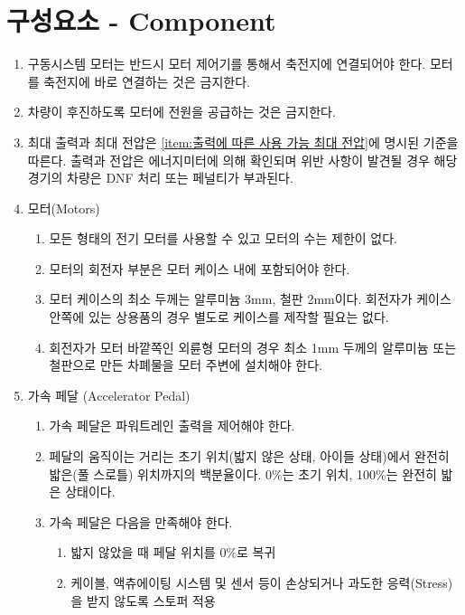 \documentclass[final,a4paper,10pt]{report}
\begin{document}
\section{구성요소 - Component}
\begin{enumerate}
  \item 구동시스템 모터는 반드시 모터 제어기를 통해서 축전지에 연결되어야 한다. 모터를 축전지에 바로 연결하는 것은 금지한다.
  \item 차량이 후진하도록 모터에 전원을 공급하는 것은 금지한다.
  \item 최대 출력과 최대 전압은 \cref{item:출력에 따른 사용 가능 최대 전압}에 명시된 기준을 따른다. 출력과 전압은 에너지미터에 의해 확인되며 위반 사항이 발견될 경우 해당 경기의 차량은 DNF 처리 또는 페널티가 부과된다.
  
  \item 모터(Motors)
    \begin{enumerate}
      \item 모든 형태의 전기 모터를 사용할 수 있고 모터의 수는 제한이 없다.
      \item 모터의 회전자 부분은 모터 케이스 내에 포함되어야 한다.
      \item 모터 케이스의 최소 두께는 알루미늄 3mm, 철판 2mm이다. 회전자가 케이스 안쪽에 있는 상용품의 경우 별도로 케이스를 제작할 필요는 없다.
      \item 회전자가 모터 바깥쪽인 외륜형 모터의 경우 최소 1mm 두께의 알루미늄 또는 철판으로 만든 차폐물을 모터 주변에 설치해야 한다.
    \end{enumerate}
    
  \item 가속 페달 (Accelerator Pedal) \label{item:가속 페달}
    \begin{enumerate}
      \item 가속 페달은 파워트레인 출력을 제어해야 한다.
      \item 페달의 움직이는 거리는 초기 위치(밟지 않은 상태, 아이들 상태)에서 완전히 밟은(풀 스로틀) 위치까지의 백분율이다. 0\%는 초기 위치, 100\%는 완전히 밟은 상태이다.
      
      \item 가속 페달은 다음을 만족해야 한다.
        \begin{enumerate}
          \item 밟지 않았을 때 페달 위치를 0\%로 복귀
          \item 케이블, 액츄에이팅 시스템 및 센서 등이 손상되거나 과도한 응력(Stress)을 받지 않도록 스토퍼 적용
        \end{enumerate}
    \end{enumerate}
    

\end{enumerate}
\end{document}

